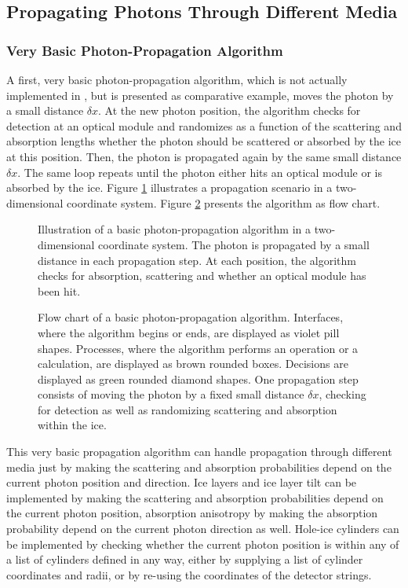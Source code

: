 \subsection{Propagating Photons Through Different Media}

\subsubsection{Very Basic Photon-Propagation Algorithm}

A first, very basic photon-propagation algorithm, which is not actually
implemented in \clsim, but is presented as comparative example, moves
the photon by a small distance \(\delta x\). At the new photon position,
the algorithm checks for detection at an optical module and randomizes
as a function of the scattering and absorption lengths whether the
photon should be scattered or absorbed by the ice at this position.
Then, the photon is propagated again by the same small distance
\(\delta x\). The same loop repeats until the photon either hits an
optical module or is absorbed by the ice. Figure \ref{fig:ieph6Bie}
illustrates a propagation scenario in a two-dimensional coordinate
system. Figure \ref{fig:ohsa0miG} presents the algorithm as flow chart.

\begin{figure}[htb]
  \caption{Illustration of a basic photon-propagation algorithm in a two-dimensional coordinate system. The photon is propagated by a small distance in each propagation step. At each position, the algorithm checks for absorption, scattering and whether an optical module has been hit.}
  \label{fig:ieph6Bie}
\end{figure}

\begin{figure}[p]
  \caption{Flow chart of a basic photon-propagation algorithm. Interfaces, where the algorithm begins or ends, are displayed as violet pill shapes. Processes, where the algorithm performs an operation or a calculation, are displayed as brown rounded boxes. Decisions are displayed as green rounded diamond shapes. One propagation step consists of moving the photon by a fixed small distance $\delta x$, checking for detection as well as randomizing scattering and absorption within the ice.}
  \label{fig:ohsa0miG}
\end{figure}

This very basic propagation algorithm can handle propagation through
different media just by making the scattering and absorption
probabilities depend on the current photon position and direction. Ice
layers and ice layer tilt can be implemented by making the scattering
and absorption probabilities depend on the current photon position,
absorption anisotropy by making the absorption probability depend on the
current photon direction as well. Hole-ice cylinders can be implemented
by checking whether the current photon position is within any of a list
of cylinders defined in any way, either by supplying a list of cylinder
coordinates and radii, or by re-using the coordinates of the detector
strings.

